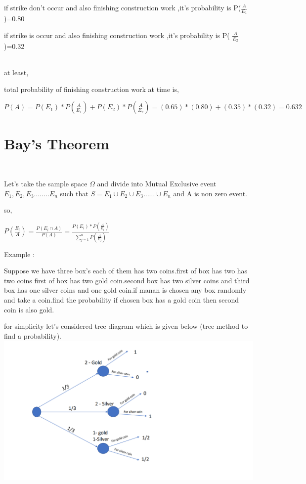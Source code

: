 \documentclass[a4paper,12pt]{article}
\theoremstyle{definition}
\begin{document}
\par if strike don't occur and also finishing construction work ,it's probability is P($\frac{A}{E_1}$)=0.80\\
\par if strike is occur and also finishing construction work ,it's probability is P( $\frac{A}{E_2}$)=0.32\\
\\
\par at least,
\par total probability of finishing construction  work at time is,
\begin{center}
      $ P(A) = P(E_1)*P(\frac{A}{E_1}) + P(E_2)*P(\frac{A}{E_2})
            = (0.65)*(0.80)+(0.35)*(0.32)
            = 0.632 $
\end{center}
\section{Bay's Theorem}\\
\par Let's take the sample space $ \Omega $ and divide into Mutual Exclusive event ${E_1,E_2,E_3........E_n}$ such that $ S = E_1 \cup E_2 \cup E_3 ......\cup E_n $ and A is non zero event.\\
\par so,
\begin{center}
    $P(\frac{E_i}{A}) = \frac{P(E_i \cap A )}{P(A)} = \frac{P(E_i) * P(\frac{A}{E_i})}{\sum_{j=1}^{n}{P(\frac{A}{E_j})}} $
\end{center} 
\vskip 0.25cm
Example :
\par Suppose we have three box's each of them has two coins.first of box has two has two coins first of box has two gold coin.second box has two silver coins and third box has one silver coins and  one gold coin.if manan is chosen any box randomly and take a coin.find the probability if chosen box has a gold  coin  then second coin is also gold.
\vskip 0.5cm\\
\par for simplicity let's considered tree diagram  which is given below (tree method to find a probability).\\
\includegraphics[width=\linewidth]{
treeprob.png}\par
\end{document}
